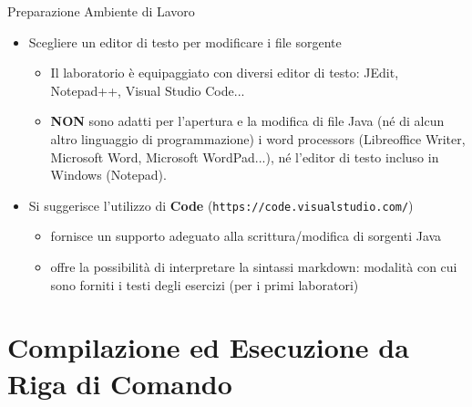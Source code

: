\documentclass[xcolor=dvipsnames,presentation]{beamer}
\begin{document}
\begin{frame}{Preparazione Ambiente di Lavoro}
    \begin{itemize}
        \item Scegliere un editor di testo per modificare i file sorgente
        \begin{itemize}
            \item Il laboratorio è equipaggiato con diversi editor di testo: JEdit, Notepad++, Visual Studio Code...
            \item \textbf{NON} sono adatti per l'apertura e la modifica di file Java
            (né di alcun altro linguaggio di programmazione) i word processors (Libreoffice Writer, Microsoft Word, Microsoft WordPad...), né l'editor di testo incluso in Windows (Notepad).
        \end{itemize}
        \item Si suggerisce l'utilizzo di \textbf{Code} (\texttt{https://code.visualstudio.com/})
        \begin{itemize}
            \item fornisce un supporto adeguato alla scrittura/modifica di sorgenti Java
            \item offre la possibilità di interpretare la sintassi markdown: modalità con cui sono forniti i testi degli esercizi (per i primi laboratori)
        \end{itemize}
    \end{itemize}
\end{frame}

\section{Compilazione ed Esecuzione da Riga di Comando}

\end{document}
